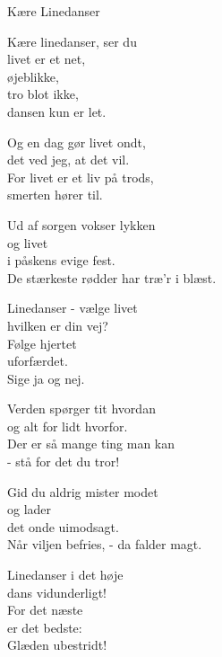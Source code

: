 \begin{song}{Kære Linedanser}
\begin{SBVerse}
  Kære linedanser, ser du \\
  livet er et net, \\
  øjeblikke,  \\
  tro blot ikke, \\
  dansen kun er let. \\ \medskip

  Og en dag gør livet ondt, \\
  det ved jeg, at det vil. \\
  For livet er et liv på trods, \\
  smerten hører til. \\ \medskip

  Ud af sorgen vokser lykken \\
  og livet  \\
  i påskens evige fest. \\
  De stærkeste rødder har træ'r i blæst. \\
\end{SBVerse}

\begin{SBVerse}
  Linedanser - vælge livet \\
  hvilken er din vej? \\
  Følge hjertet \\
  uforfærdet. \\
  Sige ja og nej. \\ \medskip

  Verden spørger tit hvordan \\
  og alt for lidt hvorfor. \\
  Der er så mange ting man kan \\
  - stå for det du tror! \\ \medskip

  Gid du aldrig mister modet \\
  og lader  \\
  det onde uimodsagt. \\
  Når viljen befries, - da falder magt. \\
\end{SBVerse}

\begin{SBVerse}
  Linedanser i det høje \\
  dans vidunderligt! \\
  For det næste \\
  er det bedste: \\
  Glæden ubestridt! \\ \medskip
  

\end{SBVerse}
\end{song}
